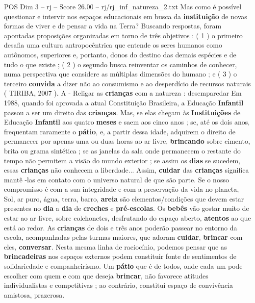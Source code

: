\begin{textsample}{POS Dim 3 – rj – Score 26.00 – rj/rj\_inf\_natureza\_2.txt}  \label{ex:f3_pos_005}
Mas como é possível questionar e intervir nos espaços educacionais em busca da \textbf{instituição} de novas formas de viver e de pensar a vida na Terra?
Buscando respostas, foram apontadas proposições organizadas em torno de três objetivos : ( 1 ) o primeiro desafia uma cultura antropocêntrica que entende os seres humanos como autônomos, superiores e, portanto, donos do destino das demais espécies e de tudo o que existe ; ( 2 ) o segundo busca reinventar os caminhos de conhecer, numa perspectiva que considere as múltiplas dimensões do humano ; e ( 3 ) o terceiro \textbf{convida} a dizer não ao consumismo e ao desperdício de recursos naturais ( TIRIBA, 2007 ).
A - Religar as \textbf{crianças} com a natureza : desemparedar Em 1988, quando foi aprovada a atual Constituição Brasileira, a Educação \textbf{Infantil} passou a ser um direito das \textbf{crianças}.
Mas, se elas chegam às \textbf{Instituições} de Educação \textbf{Infantil} aos quatro \textbf{meses} e saem aos cinco anos ; se, até os dois anos, frequentam raramente o \textbf{pátio}, e, a partir dessa idade, adquirem o direito de permanecer por apenas uma ou duas horas ao ar livre, \textbf{brincando} sobre cimento, brita ou grama sintética ; se as janelas da sala onde permanecem o restante do tempo não permitem a visão do mundo exterior ; se assim os \textbf{dias} se sucedem, essas \textbf{crianças} não conhecem a liberdade...
Assim, \textbf{cuidar} das \textbf{crianças} significa mantê -las em contato com o universo natural de que são parte.
Se o nosso compromisso é com a sua integridade e com a preservação da vida no planeta, Sol, ar puro, água, terra, barro, \textbf{areia} são elementos/condições que devem estar presentes no \textbf{dia} a \textbf{dia} de \textbf{creches} e \textbf{pré-escolas}.
Os \textbf{bebês} vão gostar muito de estar ao ar livre, sobre colchonetes, desfrutando do espaço aberto, \textbf{atentos} ao que está ao redor.
As \textbf{crianças} de dois e três anos poderão passear no entorno da escola, acompanhadas pelas turmas maiores, que adoram \textbf{cuidar}, \textbf{brincar} com eles, \textbf{conversar}.
Nesta mesma linha de raciocínio, podemos pensar que as \textbf{brincadeiras} nos espaços externos podem constituir fonte de sentimentos de solidariedade e companheirismo.
Um \textbf{pátio} que é de todos, onde cada um pode escolher com quem e com que deseja \textbf{brincar}, não favorece atitudes individualistas e competitivas ; ao contrário, constitui espaço de convivência amistosa, prazerosa.

\end{textsample}
